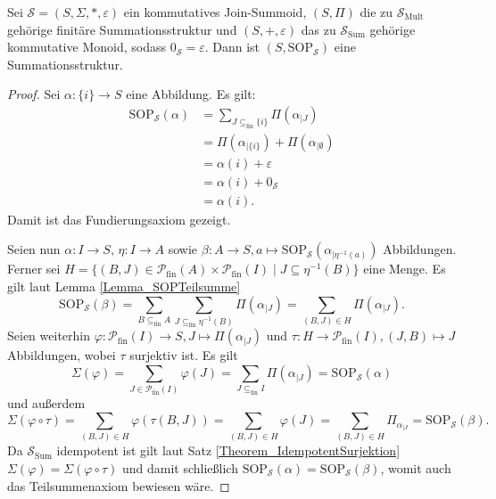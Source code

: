 \documentclass{article}
\begin{document}
\begin{theorem}
  Sei $\mathcal{S} = (S, \Sigma, \ast, \varepsilon)$ ein kommutatives Join-Summoid,
  $(S, \Pi)$ die zu $\mathcal{S}_\text{Mult}$ gehörige finitäre Summationsstruktur
  und $(S, +, \varepsilon)$ das zu $\mathcal{S}_\text{Sum}$ gehörige kommutative Monoid,
  sodass $0_\mathcal{S} = \varepsilon$.
  Dann ist $(S, \text{SOP}_\mathcal{S})$ eine Summationsstruktur.
\end{theorem}
\begin{proof}
  Sei $\alpha \colon \{i\} \to S$ eine Abbildung.
  Es gilt:
  \begin{align*}
    \text{SOP}_\mathcal{S}(\alpha) &= \sum_{J \subseteq_{\text{fin}} \{i\}}\Pi(\alpha_{\mid J}) \\
    &= \Pi(\alpha_{\mid \{i\}}) + \Pi(\alpha_{\mid \emptyset}) \\
    &= \alpha(i) + \varepsilon \\
    &= \alpha(i) + 0_\mathcal{S} \\
    &= \alpha(i).
  \end{align*}
  Damit ist das Fundierungsaxiom gezeigt. 
  
  Seien nun $\alpha \colon I \to S$,
  $\eta \colon I \to A$
  sowie $\beta \colon A \to S, a \mapsto \text{SOP}_\mathcal{S}(\alpha_{\mid \eta^{-1}(a)})$ Abbildungen.
  Ferner sei $H = \{(B, J) \in \mathcal{P}_\text{fin}(A) \times \mathcal{P}_\text{fin}(I) \mid J \subseteq \eta^{-1}(B)\}$ eine Menge.
  Es gilt laut Lemma \ref{Lemma_SOPTeilsumme}
  \begin{equation*}
    \text{SOP}_\mathcal{S}(\beta) 
    = \sum_{B \subseteq_\text{fin} A}\sum_{J \subseteq_\text{fin} \eta^{-1}(B)}\Pi(\alpha_{\mid J})
    = \sum_{(B, J) \in H} \Pi(\alpha_{\mid J}).
  \end{equation*}
  Seien weiterhin $\varphi \colon \mathcal{P}_\text{fin}(I) \to S, J \mapsto \Pi(\alpha_{\mid J})$
  und $\tau \colon H \to \mathcal{P}_\text{fin}(I), (J, B) \mapsto J$ Abbildungen,
  wobei $\tau$ surjektiv ist.
  Es gilt
  \begin{equation*}
    \Sigma(\varphi)
    = \sum_{J \in \mathcal{P}_\text{fin}(I)} \varphi(J)
    = \sum_{J \subseteq_\text{fin} I} \Pi(\alpha_{\mid J})
    = \text{SOP}_\mathcal{S}(\alpha)
  \end{equation*}
  und außerdem
  \begin{equation*}
    \Sigma(\varphi \circ \tau)
    = \sum_{(B, J) \in H} \varphi(\tau(B, J))
    = \sum_{(B, J) \in H} \varphi(J)
    = \sum_{(B, J) \in H} \Pi_{\alpha_{\mid J}}
    = \text{SOP}_\mathcal{S}(\beta).
  \end{equation*}
  Da $\mathcal{S}_\text{Sum}$ idempotent ist gilt laut Satz \ref{Theorem_IdempotentSurjektion} $\Sigma(\varphi) = \Sigma(\varphi \circ \tau)$
  und damit schließlich $\text{SOP}_\mathcal{S}(\alpha) = \text{SOP}_\mathcal{S}(\beta)$,
  womit auch das Teilsummenaxiom bewiesen wäre.
\end{proof}
\end{document}
